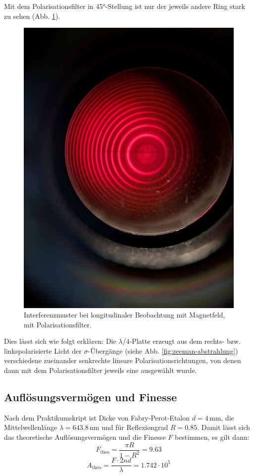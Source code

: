 \documentclass{article}
\begin{document}
\begin{multicols}{2}
Mit dem Polarisationsfilter in \ang{45}-Stellung ist nur der jeweils andere Ring stark zu sehen (Abb. \ref{fig:zeeman-longitudinal-mit-45}).
\begin{figure}[H]
  \centering
  \includegraphics[width=.8\linewidth]{zeeman-longitudinal-mit-45}
  \caption{Interferenzmuster bei longitudinaler Beobachtung mit Magnetfeld, mit Polarisationsfilter.}
  \label{fig:zeeman-longitudinal-mit-45}
\end{figure}

Dies lässt sich wie folgt erklären: Die $\lambda / 4$-Platte erzeugt aus dem
rechts- bzw. linkspolarisierte Licht der $\sigma$-Übergänge
(siehe Abb. \ref{fig:zeeman-abstrahlung}) verschiedene zueinander senkrechte lineare Polarisationsrichtungen,
von denen dann mit dem Polarisationsfilter jeweils eine ausgewählt wurde.


\subsection{Auflösungsvermögen und Finesse}

Nach dem Praktikumskript ist Dicke von Fabry-Perot-Etalon 
$d = 4 \, \text{mm}$, die Mittelwellenlänge $\lambda = 643.8 \, \text{nm}$ und 
für Reflexiongrad $R=0.85$.
Damit lässt sich das theoretische Auflösungsvermögen und die Finesse $F$ 
bestimmen, es gilt dann:
\[
F_{\text{theo}} = \frac{\pi R}{1 - R^2}= 9.63
\]
\[
  A_{\text{theo}} = \frac{F \cdot 2nd}{\lambda} = 1.742 \cdot 10^5
\]


\end{multicols}
\end{document}
